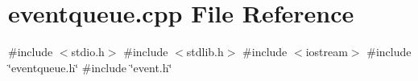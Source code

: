 \section{eventqueue.\+cpp File Reference}
\label{eventqueue_8cpp}
{\ttfamily \#include $<$stdio.\+h$>$}\newline
{\ttfamily \#include $<$stdlib.\+h$>$}\newline
{\ttfamily \#include $<$iostream$>$}\newline
{\ttfamily \#include \char`\"{}eventqueue.\+h\char`\"{}}\newline
{\ttfamily \#include \char`\"{}event.\+h\char`\"{}}\newline
